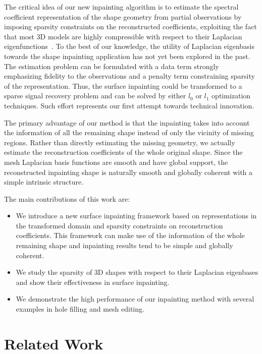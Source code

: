 The critical idea of our new inpainting algorithm is to estimate the
spectral coefficient representation of the shape geometry from partial
observations by imposing sparsity constraints on the reconstructed
coefficients, exploiting the fact that most 3D models are highly
compressible with respect to their Laplacian eigenfunctions~\cite{Karni2000}.
To the best of our knowledge, the utility of Laplacian eigenbasis towards
the shape inpainting application has not yet been explored in the past.
The estimation problem can be formulated with a data term strongly emphasizing
fidelity to the observations and a penalty term constraining sparsity of the
representation. Thus, the surface inpainting could be transformed to a
sparse signal recovery problem and can be solved by either $l_0$ or
$l_1$ optimization techniques. Such effort represents our first
attempt towards technical innovation.

The primary advantage of our method is that the inpainting takes into
account the information of all the remaining shape instead of only the
vicinity of missing regions. Rather than directly estimating the
missing geometry, we actually estimate the reconstruction coefficients
of the whole original shape. Since the mesh Laplacian basis functions are
smooth and have global support, the reconstructed inpainting shape is
naturally smooth and globally coherent with a simple intrinsic
structure.

The main contributions of this work are:
\begin{itemize}

\item We introduce a new surface inpainting framework based on
  representations in the transformed domain and sparsity constraints
  on reconstruction coefficients. This framework can make use of the
  information of the whole remaining shape and inpainting results
  tend to be simple and globally coherent.

\item We study the sparsity of 3D shapes with respect to their
  Laplacian eigenbases and show their effectiveness in surface
  inpainting.

\item We demonstrate the high performance of our inpainting method
  with several examples in hole filling and mesh editing.

\end{itemize}


\section{Related Work}
\label{sec:related}

